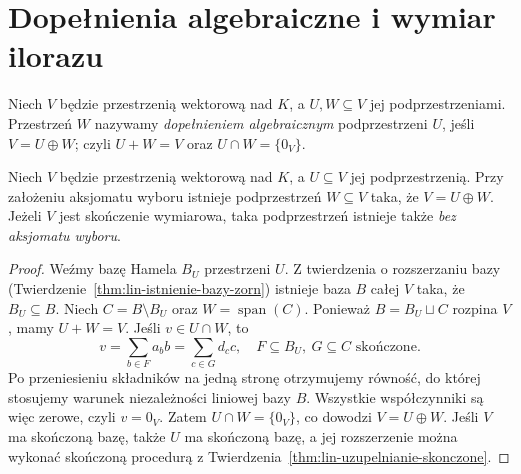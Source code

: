 \section{Dopełnienia algebraiczne i wymiar ilorazu}
\label{sec:lin2-dopelnienia}

\begin{definicja}
\label{def:lin2-dopelnienie}
Niech \(V\) będzie przestrzenią wektorową nad \(K\),
a \(U,W\subseteq V\) jej podprzestrzeniami.
Przestrzeń \(W\) nazywamy
\emph{dopełnieniem algebraicznym}
podprzestrzeni \(U\), jeśli
\(V=U\oplus W\); czyli \(U+W=V\)
oraz \(U\cap W=\{0_V\}\).
\end{definicja}

\begin{twierdzenie}
\label{thm:lin2-istnienie-dopelnienia}
Niech \(V\) będzie przestrzenią wektorową nad \(K\),
a \(U\subseteq V\) jej podprzestrzenią.
Przy założeniu aksjomatu wyboru istnieje
podprzestrzeń \(W\subseteq V\) taka,
że \(V=U\oplus W\).
Jeżeli \(V\) jest skończenie wymiarowa,
taka podprzestrzeń istnieje także
\emph{bez aksjomatu wyboru}.
\end{twierdzenie}
\begin{proof}
Weźmy bazę Hamela \(B_U\) przestrzeni \(U\).
Z twierdzenia o rozszerzaniu bazy
(Twierdzenie~\ref{thm:lin-istnienie-bazy-zorn})
istnieje baza \(B\) całej \(V\)
taka, że \(B_U\subseteq B\).
Niech \(C=B\setminus B_U\) oraz
\(W=\operatorname{span}(C)\).
Ponieważ \(B=B_U\sqcup C\) rozpina \(V\),
mamy \(U+W=V\).
Jeśli \(v\in U\cap W\), to
\[
 v=\sum_{b\in F}a_bb=\sum_{c\in G}d_cc,
 \quad F\subseteq B_U,\ G\subseteq C\text{ skończone}.
\]
Po przeniesieniu składników na jedną stronę
otrzymujemy równość, do której stosujemy
warunek niezależności liniowej bazy \(B\).
Wszystkie współczynniki są więc zerowe,
czyli \(v=0_V\).
Zatem \(U\cap W=\{0_V\}\), co dowodzi
\(V=U\oplus W\).
Jeśli \(V\) ma skończoną bazę, także \(U\)
ma skończoną bazę, a jej rozszerzenie
można wykonać skończoną procedurą
z Twierdzenia~\ref{thm:lin-uzupelnianie-skonczone}.
\end{proof}

